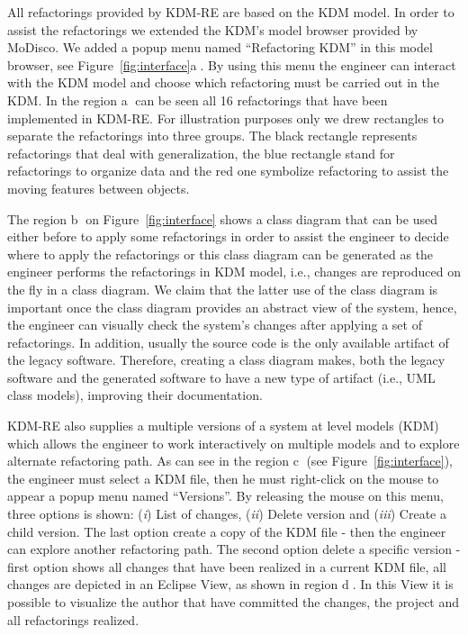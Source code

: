 All refactorings provided by KDM-RE are based on the KDM model. 
In order to assist the refactorings we extended the KDM's model browser provided by MoDisco. 
We added a popup menu named ``Refactoring KDM'' in this model browser, see Figure~\ref{fig:interface}\textcircled{a}.
By using this menu the engineer can interact with the KDM model and choose which refactoring must be carried out in the KDM.
In the region \textcircled{a} can be seen all 16 refactorings that have been implemented in KDM-RE. 
For illustration purposes only we drew rectangles to separate the refactorings into three groups. 
The black rectangle represents refactorings that deal with generalization, the blue rectangle stand for refactorings to organize data and the red one symbolize refactoring to assist the moving features between objects.

The region \textcircled{b} on Figure~\ref{fig:interface} shows a class diagram that can be used either before to apply some refactorings in order to assist the engineer to decide where to apply the refactorings or this class diagram can be generated as the engineer performs the refactorings in KDM model, i.e., changes are reproduced on the fly in a class diagram.
We claim that the latter use of the class diagram is important once the class diagram provides an abstract view of the system, hence, the engineer can visually check the system's changes after applying a set of refactorings. 
In addition, usually the source code is the only available artifact of the legacy software. 
Therefore, creating a class diagram makes, both the legacy software and the generated software to have a new type of artifact (i.e., UML class models), improving their documentation.

KDM-RE also supplies a multiple versions of a system at level models (KDM) which allows the engineer to work interactively on multiple models and to explore alternate refactoring path. As can see in the region \textcircled{c} (see Figure~\ref{fig:interface}), the engineer must select a KDM file, then he must right-click on the mouse to appear a popup menu named ``Versions''. By releasing the mouse on this menu, three options is shown: (\textit{i}) List of changes, (\textit{ii}) Delete version and (\textit{iii}) Create a child version. The last option create a copy of the KDM file - then the engineer can explore another refactoring path. The second option delete a specific version - first option shows all changes that have been realized in a current KDM file, all changes are depicted in an Eclipse View, as shown in region \textcircled{d}. In this View it is possible to visualize the author that have committed the changes, the project and all refactorings realized.


